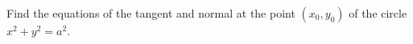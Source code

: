 Find the equations of the tangent and normal at the point $(x_{0}, y_{0})$
of the circle $x^{2} + y^{2} = a^{2}$.


